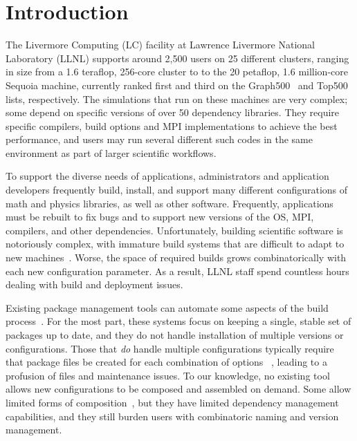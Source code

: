 
\section{Introduction}
\label{sec:intro}

The Livermore Computing (LC) facility at Lawrence Livermore National Laboratory
(LLNL) supports around 2,500 users on 25 different clusters, ranging 
in size from a 1.6 teraflop, 256-core cluster to to the
20 petaflop, 1.6 million-core Sequoia machine, currently ranked first and
third on the Graph500~\cite{graph500} and Top500~\cite{top500}
lists, respectively.
%
%
The simulations that run on these machines are very complex; some
depend on specific versions of over 50 dependency libraries.
They require specific compilers, build options and MPI implementations to
achieve the best performance, and users may run several
different such codes in the same environment as part of larger 
scientific workflows.

To support the diverse needs of applications, administrators and application
developers 
frequently build, install, and support many different configurations
of math and physics libraries, as well as other software.
Frequently, applications must be rebuilt to fix bugs and to support
new versions of the OS, MPI, compilers, and other dependencies.
Unfortunately, building scientific software is notoriously complex, with
immature build systems that are difficult to adapt to new
machines~\cite{dubois+:comp-sci-eng,hoste+:pyhpc12,wilson+:corr}.
Worse, the space of required builds grows combinatorically
with each new configuration parameter. As a result, LLNL staff
spend countless hours dealing with build and deployment issues.

Existing package management tools can automate some aspects of the build 
process~\cite{bsdports,digirolamo:smithy,dolstra+:icfp08,dolstra+:lisa04,hashdist,homebrew,hoste+:pyhpc12,macports,thiruvathukal:gentoo04}.
For the most part, these systems focus on keeping a single, stable set of 
packages up to date, and they do not handle installation of multiple
versions or configurations.  Those that {\it do} handle multiple configurations
typically require that package files be created for each combination of 
options~ \cite{digirolamo:smithy,dolstra+:icfp08,dolstra+:lisa04,hashdist,hoste+:pyhpc12}, 
leading to a profusion of files and maintenance issues.
To our knowledge, no existing tool allows new configurations to be composed
and assembled on demand.  Some allow limited forms of 
composition~\cite{hoste+:pyhpc12,dolstra+:icfp08,dolstra+:lisa04}, but they
have limited dependency management capabilities, and they still burden
users with combinatoric naming and version management.

